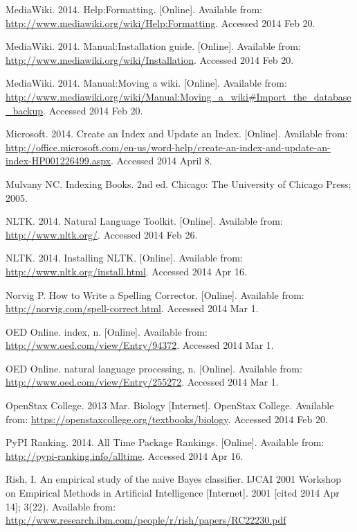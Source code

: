 \begin{thebibliography}{99}
MediaWiki. 2014. Help:Formatting. [Online]. Available from: \url{http://www.mediawiki.org/wiki/Help:Formatting}. Accessed 2014 Feb 20.

MediaWiki. 2014. Manual:Installation guide. [Online]. Available from: \url{http://www.mediawiki.org/wiki/Installation}. Accessed 2014 Feb 20.

MediaWiki. 2014. Manual:Moving a wiki. [Online]. Available from: \url{http://www.mediawiki.org/wiki/Manual:Moving_a_wiki#Import_the_database_backup}. Accessed 2014 Feb 20.

Microsoft. 2014. Create an Index and Update an Index. [Online]. Available from: \url{http://office.microsoft.com/en-us/word-help/create-an-index-and-update-an-index-HP001226499.aspx}. Accessed 2014 April 8.

Mulvany NC. Indexing Books. 2nd ed. Chicago: The University of Chicago Press; 2005.

NLTK. 2014. Natural Language Toolkit. [Online]. Available from: \url{http://www.nltk.org/}. Accessed 2014 Feb 26.

NLTK. 2014. Installing NLTK. [Online]. Available from: \url{http://www.nltk.org/install.html}. Accessed 2014 Apr 16.

Norvig P. How to Write a Spelling Corrector. [Online]. Available from: \url{http://norvig.com/spell-correct.html}. Accessed 2014 Mar 1.

OED Online. index, n. [Online]. Available from: \url{http://www.oed.com/view/Entry/94372}. Accessed 2014 Mar 1.

OED Online. natural language processing, n. [Online]. Available from: \url{http://www.oed.com/view/Entry/255272}. Accessed 2014 Mar 1.

OpenStax College. 2013 Mar. Biology [Internet]. OpenStax College. Available from: \url{https://openstaxcollege.org/textbooks/biology}. Accessed 2014 Feb 20.

PyPI Ranking. 2014. All Time Package Rankings. [Online]. Available from: \url{http://pypi-ranking.info/alltime}. Accessed 2014 Apr 16.

Rish, I. An empirical study of the naive Bayes classifier. IJCAI 2001 Workshop on Empirical Methods in Artificial Intelligence [Internet]. 2001 [cited 2014 Apr 14]; 3(22). Available from: \url{http://www.research.ibm.com/people/r/rish/papers/RC22230.pdf}


\end{thebibliography}
